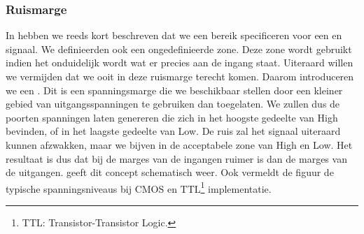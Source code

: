 \subsubsection{Ruismarge}
In  hebben we reeds kort beschreven dat we een bereik specificeren voor een  en  signaal.  We definieerden ook een ongedefinieerde zone. Deze zone wordt gebruikt indien het onduidelijk wordt wat er precies aan de ingang staat. Uiteraard willen we vermijden dat we ooit in deze ruismarge terecht komen. Daarom introduceren we een . Dit is een spanningsmarge die we beschikbaar stellen door een kleiner gebied van uitgangsspanningen te gebruiken dan toegelaten. We zullen dus de poorten spanningen laten genereren die zich in het hoogste gedeelte van High bevinden, of in het laagste gedeelte van Low. De ruis zal het signaal uiteraard kunnen afzwakken, maar we bijven in de acceptabele zone van High en Low. Het resultaat is dus dat bij de marges van de ingangen ruimer is dan de marges van de uitgangen.  geeft dit concept schematisch weer. Ook vermeldt de figuur de typische spanningsniveaus bij CMOS en TTL\footnote{TTL: Transistor-Transistor Logic.} implementatie.
